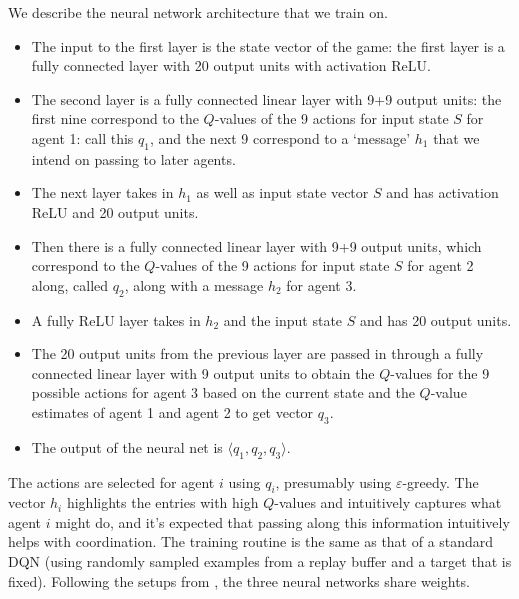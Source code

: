 \documentclass{article}
\begin{document}
We describe the neural network architecture that we train
on.
\begin{itemize}

\item The input to the first layer is the state vector of
the game: the first layer is a fully connected layer
with 20 output units with activation ReLU.

\item The second layer is a fully connected linear layer
with 9+9 output units: the first nine correspond to the $Q$-values
of the 9 actions for input state $S$ for agent 1: call
this $q_1$, and the next 9 correspond to a `message' $h_1$ that
we intend on passing to later agents.

\item The next layer takes in $h_1$ as well as input
state vector $S$ and has activation ReLU and 20 output
units.

\item Then there is a fully connected linear layer with
9+9 output units, which correspond to the $Q$-values
of the 9 actions for input state $S$ for agent 2
along, called $q_2$, along with a message $h_2$
for agent 3.

\item A fully ReLU layer takes in $h_2$ and the input
state $S$ and has 20 output units.

\item The 20 output units from the previous layer are
passed in through a fully connected linear layer with
9 output units to obtain the $Q$-values for the 9
possible actions for agent 3 based on the current state
and the $Q$-value estimates of agent 1 and agent 2
to get vector $q_3$.

\item The output of the neural net is $\langle q_1,q_2,q_3
\rangle$.

\end{itemize}

The actions are selected for agent $i$ using $q_i$,
presumably using $\varepsilon$-greedy.
The vector $h_i$ highlights the entries with
high $Q$-values and intuitively captures
what agent $i$ might do, and it's expected that
passing along this information intuitively helps
with coordination. The training routine is the same as that
of a standard DQN (using randomly sampled examples from
a replay buffer and a target that is fixed).
Following the setups from \cite{foerster2016learning,
sukhbaatar2016learning}, the three neural networks share
weights.
\end{document}

